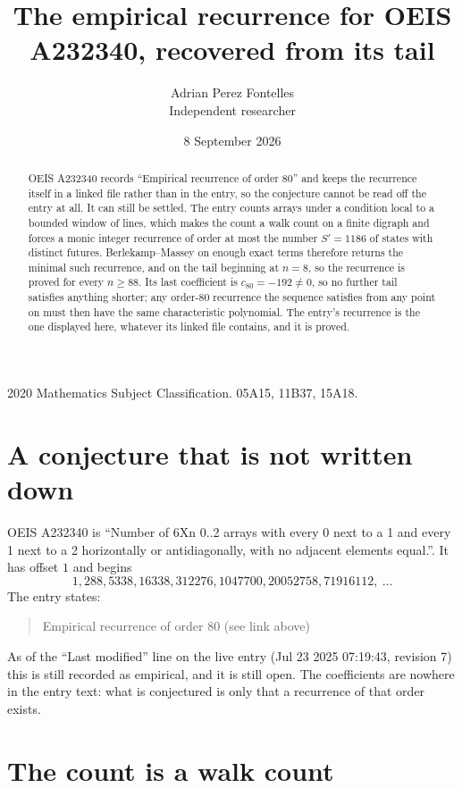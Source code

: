 \documentclass[11pt,a4paper]{article}
\title{The empirical recurrence for OEIS A232340, recovered from its tail}
\author{Adrian Perez Fontelles\\ \small Independent researcher}
\date{8 September 2026}
\theoremstyle{plain}
\theoremstyle{definition}
\begin{document}
\maketitle

\begin{abstract}
OEIS A232340 records ``Empirical recurrence of order $80$'' and keeps the recurrence itself in
a linked file rather than in the entry, so the conjecture cannot be read off the entry at all.
It can still be settled. The entry counts arrays under a condition local to a bounded window of
lines, which makes the count a walk count on a finite digraph and forces a monic integer
recurrence of order at most the number $S'=1186$ of states with distinct futures. Berlekamp--Massey on
enough exact terms therefore returns the minimal such recurrence, and on the tail beginning at $n=8$, so the recurrence is proved for every $n\ge88$.
Its last coefficient is $c_{80}=-192\neq0$, so no further tail satisfies anything
shorter; any order-$80$ recurrence the sequence satisfies from any point on must then have
the same characteristic polynomial. The entry's recurrence is the one displayed here, whatever
its linked file contains, and it is proved.
\end{abstract}

\noindent\small 2020 Mathematics Subject Classification. 05A15, 11B37, 15A18.\normalsize

\section{A conjecture that is not written down}

OEIS A232340 is ``Number of 6Xn 0..2 arrays with every 0 next to a 1 and every 1 next to a 2 horizontally or antidiagonally, with no adjacent elements equal.''. It has offset $1$ and begins
\[
1, 288, 5338, 16338, 312276, 1047700, 20052758, 71916112,\ \dots
\]
The entry states:
\begin{quote}
Empirical recurrence of order 80 (see link above)
\end{quote}
As of the ``Last modified'' line on the live entry (Jul 23 2025 07:19:43, revision 7)
this is still recorded as empirical, and it is still open. The coefficients are nowhere in the
entry text: what is conjectured is only that a recurrence of that order exists.

\section{The count is a walk count}
\end{document}
